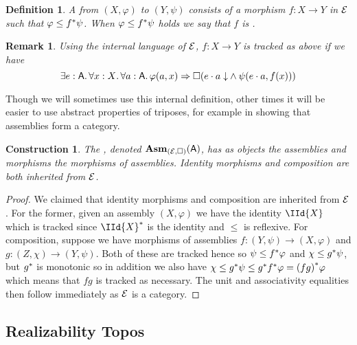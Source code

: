 \documentclass[11pt]{article}
\newtheorem{defn}[thrm]{Definition}
\newtheorem{remk}[thrm]{Remark}
\newtheorem{cons}[thrm]{Construction}
\begin{document}
\begin{defn}\label{defn:assembly-morphism}
  A  from \((X,\varphi)\) to
  \((Y,\psi)\) consists of a morphism \(f : X \to Y\) in \(\mathcal{E}\) such that
  \(\varphi \leq {f}^\ast\psi\). When \(\varphi \leq {f}^\ast\psi\) holds
  we say that \(f\) is .
\end{defn}

\begin{remk}
  Using the internal language of \(\mathcal{E}\), \(f : X \to Y\) is tracked as above
  if we have
  \[
    \IExists{e : \A}{
      \IForall{x : \X}{
        \IForall{a : \A}{
          \IImplies%
            {\varphi(a,x)}%
            {\IBox{(
              \IAnd%
              {\ITotal{\IAp{e}{a}}}%
              {\psi(\IAp{e}{a}, f(x))}
            )}}
        }
      }
    }
  \]
\end{remk}

Though we will sometimes use this internal definition, other times it will be
easier to use abstract properties of triposes, for example in showing that
assemblies form a category.

\begin{cons}
  The , denoted \(\mathbf{Asm}_{(\mathcal{E},\Box)}(\mathsf{A})\),
  has as objects the assemblies and morphisms the morphisms of assemblies.
  Identity morphisms and composition are both inherited from \(\mathcal{E}\).
\end{cons}
\begin{proof}
  We claimed that identity morphisms and composition are inherited from \(\mathcal{E}\).
  For the former, given an assembly \((X,\varphi)\) we have the identity
  \(\IId{X}\) which is tracked since \(\TPull{\IId{X}}\) is the identity and
  \(\leq\) is reflexive.
  For composition, suppose we have morphisms of assemblies
  \(f : (Y,\psi) \to (X,\varphi)\) and \(g : (Z,\chi)\to(Y,\psi)\).
  Both of these are tracked hence so \(\psi \leq {f}^\ast\varphi\) and
  \(\chi \leq {g}^\ast\psi\), but \({g}^\ast\) is monotonic so in addition we
  also have
  \(\chi \leq {g}^\ast\psi \leq {g}^\ast{f}^\ast\varphi={(fg)}^\ast\varphi\)
  which means that \(fg\) is tracked as necessary.
  The unit and associativity equalities then follow immediately as \(\mathcal{E}\) is a
  category.
\end{proof}

\subsection{Realizability Topos}%
\label{sub:realizability-topos}
\end{document}
